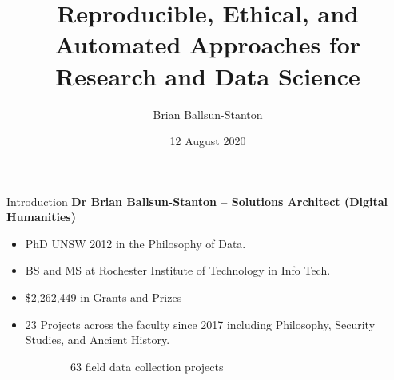\documentclass[aspectratio=1610, 11pt]{beamer} %
\title{Reproducible, Ethical, and Automated Approaches for Research and Data Science} %
\author{Brian Ballsun-Stanton}               %
\institute{Faculty of Arts}         %
\date{12 August 2020}                 %
\begin{document}
\maketitle

\begin{frame}{Introduction}
\textbf{Dr Brian Ballsun-Stanton -- Solutions Architect (Digital Humanities)}
\begin{multicols}{2}
\begin{itemize}
    \item PhD UNSW 2012 in the Philosophy of Data. 
    \item BS and MS at Rochester Institute of Technology in Info Tech.
    \item \$2,262,449 in Grants and Prizes
    \item 23 Projects across the faculty since 2017 including Philosophy, Security Studies, and Ancient History.
\end{itemize}
\end{multicols}

\begin{figure}

    \begin{subfigure}{.2\textwidth}
    \centering

    \caption{63 field data collection projects}
    \end{subfigure}%
    \hfill%
    \begin{subfigure}{.19\textwidth}


\end{subfigure}
\end{figure}
\end{frame}
\end{document}
